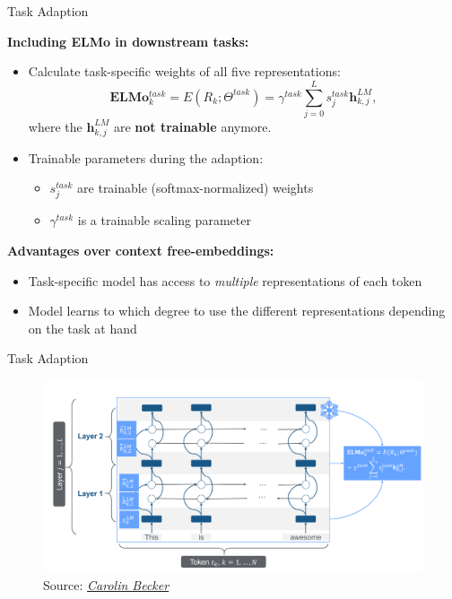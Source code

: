 
\begin{vbframe}{Task Adaption}

\vfill

\textbf{Including ELMo in downstream tasks:}

	\begin{itemize}
		\item Calculate task-specific weights of all five representations:
					$$\mathbf{E} \mathbf{L} \mathbf{M} \mathbf{o}_{k}^{t a s k}=E\left(R_{k} ; \Theta^{t a s k}\right)=\gamma^{t a s k} \sum_{j=0}^{L} s_{j}^{t a s k} \mathbf{h}_{k, j}^{L M},$$
					where the $\mathbf{h}_{k, j}^{L M}$ are \textbf{not trainable} anymore.
		\item Trainable parameters during the adaption:
			\begin{itemize}
				\item $s_{j}^{t a s k}$ are trainable (softmax-normalized) weights
				\item $\gamma^{t a s k}$ is a trainable scaling parameter
			\end{itemize}
	\end{itemize}

	\textbf{Advantages over context free-embeddings:}

	\begin{itemize}
		\item Task-specific model has access to \textit{multiple} representations of each token
		\item Model learns to which degree to use the different representations depending on the task at hand
	\end{itemize}

\vfill

\end{vbframe}


\begin{vbframe}{Task Adaption}

\vfill

	\begin{figure}
		\centering
		\includegraphics[width = 12cm]{figure/elmo-adaption}\\ 
		\footnotesize{Source:} \href{https://slds-lmu.github.io/seminar_nlp_ss20/transfer-learning-for-nlp-i.html}{\footnotesize \it Carolin Becker}
	\end{figure}

\vfill

\end{vbframe}


